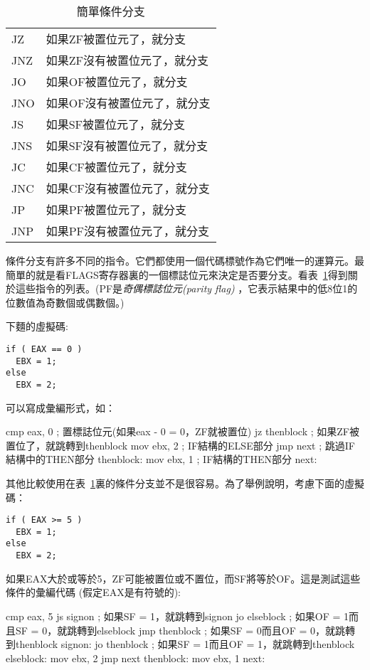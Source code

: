 \begin{table}[t]
\center
\begin{tabular}{|ll|}
\hline
JZ  & 如果ZF被置位元了，就分支 \\
JNZ & 如果ZF沒有被置位元了，就分支 \\
JO  & 如果OF被置位元了，就分支 \\
JNO & 如果OF沒有被置位元了，就分支 \\
JS  & 如果SF被置位元了，就分支 \\
JNS & 如果SF沒有被置位元了，就分支 \\
JC  & 如果CF被置位元了，就分支 \\
JNC & 如果CF沒有被置位元了，就分支 \\
JP  & 如果PF被置位元了，就分支 \\
JNP & 如果PF沒有被置位元了，就分支 \\
\hline
\end{tabular}
\caption{簡單條件分支 \label{tab:SimpBran}  
             
         }
\end{table}

條件分支有許多不同的指令。它們都使用一個代碼標號作為它們唯一的運算元。最簡單的就是看FLAGS寄存器裏的一個標誌位元來決定是否要分支。看表~\ref{tab:SimpBran}得到關於這些指令的列表。(PF是\emph{奇偶標誌位元(parity
flag)}
，它表示結果中的低8位1的位數值為奇數個或偶數個。)

下麵的虛擬碼:
\begin{Verbatim}
if ( EAX == 0 )
  EBX = 1;
else
  EBX = 2;
\end{Verbatim}
可以寫成彙編形式，如：
\begin{AsmCodeListing}[frame=none]
      cmp    eax, 0            ; 置標誌位元(如果eax - 0 = 0，ZF就被置位)
      jz     thenblock         ; 如果ZF被置位了，就跳轉到thenblock
      mov    ebx, 2            ; IF結構的ELSE部分
      jmp    next              ; 跳過IF結構中的THEN部分
thenblock:
      mov    ebx, 1            ; IF結構的THEN部分
next:
\end{AsmCodeListing}

其他比較使用在表~\ref{tab:SimpBran}裏的條件分支並不是很容易。為了舉例說明，考慮下面的虛擬碼：
\begin{Verbatim}
if ( EAX >= 5 )
  EBX = 1;
else
  EBX = 2;
\end{Verbatim}
如果EAX大於或等於5，ZF可能被置位或不置位，而SF將等於OF。這是測試這些條件的彙編代碼
(假定EAX是有符號的):
\begin{AsmCodeListing}[frame=none]
      cmp    eax, 5
      js     signon            ; 如果SF = 1，就跳轉到signon
      jo     elseblock         ; 如果OF = 1而且SF = 0，就跳轉到elseblock
      jmp    thenblock         ; 如果SF = 0而且OF = 0，就跳轉到thenblock
signon:
      jo     thenblock         ; 如果SF = 1而且OF = 1，就跳轉到thenblock
elseblock:
      mov    ebx, 2
      jmp    next
thenblock:
      mov    ebx, 1
next:
\end{AsmCodeListing}

